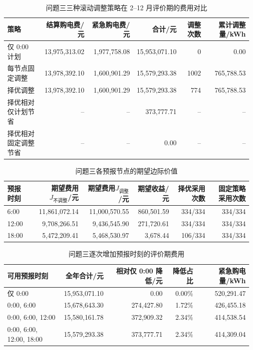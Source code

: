\begin{table}[H]
  \centering
  \caption{问题三三种滚动调整策略在 2--12 月评价期的费用对比}
  \label{tab:q3-strategy}
  \small
  \begin{tabular}{lrrrrr}
    \toprule
    策略 & 结算购电费/元 & 紧急购电费/元 & 合计/元 & 调整次数 & 累计调整量/kWh \\
    \midrule
    仅 0:00 计划 & 13,975,313.02 & 1,977,758.08 & 15,953,071.10 & 0 & 0.00 \\
    每节点固定调整 & 13,978,392.10 & 1,600,901.29 & 15,579,293.38 & 1002 & 765,788.53 \\
    择优调整 & 13,978,392.10 & 1,600,901.29 & 15,579,293.38 & 774 & 765,788.53 \\
    \midrule
    择优相对仅计划节省 & -- & -- & 373,777.71 & -- & -- \\
    择优相对固定调整节省 & -- & -- & 0.00 & -- & -- \\
    \bottomrule
  \end{tabular}
\end{table}

\begin{table}[H]
  \centering
  \caption{问题三各预报节点的期望边际价值}
  \label{tab:q3-node}
  \small
  \begin{tabular}{lrrrrr}
    \toprule
    预报时刻 & 期望费用$J_{\text{不调整}}$/元 & 期望费用$J_{\text{调整}}$/元 & 期望收益/元 & 择优采用次数 & 固定策略采用次数 \\
    \midrule
    6:00 & 11,861,072.14 & 11,000,570.55 & 860,501.59 & 334/334 & 334/334 \\
    12:00 & 9,708,266.51 & 9,436,545.90 & 271,720.61 & 334/334 & 334/334 \\
    18:00 & 5,472,209.41 & 5,468,530.97 & 3,678.44 & 106/334 & 334/334 \\
    \bottomrule
  \end{tabular}
\end{table}

\begin{table}[H]
  \centering
  \caption{问题三逐次增加预报时刻的评价期费用}
  \label{tab:q3-accum}
  \small
  \begin{tabular}{lrrrr}
    \toprule
    可用预报时刻 & 全年合计/元 & 相对仅 0:00 降低/元 & 降低占比 & 紧急购电量/kWh \\
    \midrule
    仅 0:00 & 15,953,071.10 & 0.00 & 0.00\% & 520,291.47 \\
    0:00, 6:00 & 15,678,643.30 & 274,427.80 & 1.72\% & 426,455.18 \\
    0:00, 6:00, 12:00 & 15,580,161.78 & 372,909.32 & 2.34\% & 414,538.54 \\
    0:00, 6:00, 12:00, 18:00 & 15,579,293.38 & 373,777.71 & 2.34\% & 414,309.04 \\
    \bottomrule
  \end{tabular}
\end{table}

